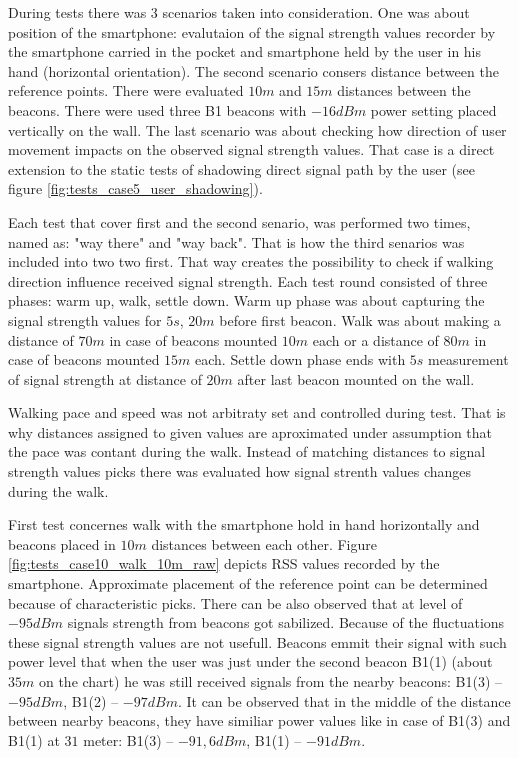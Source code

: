 \documentclass[../main.tex]{subfiles}
\begin{document}
During tests there was 3 scenarios taken into consideration. One was about position of the smartphone: evalutaion of the signal strength values recorder by the smartphone carried in the pocket and smartphone held by the user in his hand (horizontal orientation). The second scenario consers distance between the reference points. There were evaluated $10m$ and $15m$ distances between the beacons. There were used three B1 beacons with $-16dBm$ power setting placed vertically on the wall. The last scenario was about checking how direction of user movement impacts on the observed signal strength values. That case is a direct extension to the static tests of shadowing direct signal path by the user (see figure \ref{fig:tests_case5_user_shadowing}).

Each test that cover first and the second senario, was performed two times, named as: "way there" and "way back". That is how the third senarios was included into two two first. That way creates the possibility to check if walking direction influence received signal strength. Each test round consisted of three phases: warm up, walk, settle down. Warm up phase was about capturing the signal strength values for $5s$, $20m$ before first beacon. Walk was about making a distance of $70m$ in case of beacons mounted $10m$ each or a distance of $80m$ in case of beacons mounted $15m$ each. Settle down phase ends with $5s$ measurement of signal strength at distance of $20m$ after last beacon mounted on the wall.

Walking pace and speed was not arbitraty set and controlled during test. That is why distances assigned to given values are aproximated under assumption that the pace was contant during the walk. Instead of matching distances to signal strength values picks there was evaluated how signal strenth values changes during the walk.


First test concernes walk with the smartphone hold in hand horizontally and beacons placed in $10m$ distances between each other. Figure \ref{fig:tests_case10_walk_10m_raw} depicts RSS values recorded by the smartphone. Approximate placement of the reference point can be determined because of characteristic picks. There can be also observed that at level of $-95dBm$ signals strength from beacons got sabilized. Because of the fluctuations these signal strength values are not usefull. Beacons emmit their signal with such power level that when the user was just under the second beacon B1(1) (about $35m$ on the chart) he was still received signals from the nearby beacons: B1(3) -- $-95dBm$, B1(2) -- $-97dBm$. It can be observed that in the middle of the distance between nearby beacons, they have similiar power values like in case of B1(3) and B1(1) at $31$ meter: B1(3) -- $-91,6dBm$, B1(1) -- $-91dBm$.
\end{document}

